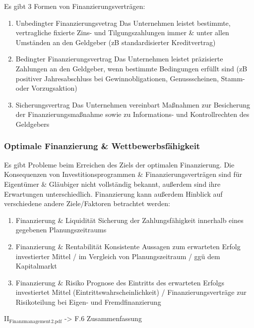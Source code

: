 \documentclass[11pt]{article}
\begin{document}
\begin{enumerate}
Es gibt 3 Formen von Finanzierungsverträgen:

\begin{enumerate}
\item Unbedingter Finanzierungsvetrag
Das Unternehmen leistet bestimmte, vertragliche fixierte Zins- und Tilgungszahlungen immer \& unter allen Umständen an den Geldgeber (zB standardisierter Kreditvertrag)

\item Bedingter Finanzierungsvertrag
Das Unternehmen leistet präzisierte Zahlungen an den Geldgeber, wenn bestimmte Bedingungen erfüllt sind (zB positiver Jahresabschluss bei Gewinnobligationen, Genussscheinen, Stamm- oder Vorzugsaktion)

\item Sicherungsvertrag
Das Unternehmen vereinbart Maßnahmen zur Besicherung der Finanzierungsmaßnahme sowie zu Informations- und Kontrollrechten des Geldgebers
\end{enumerate}
\end{enumerate}

\subsubsection{Optimale Finanzierung \& Wettbewerbsfähigkeit}
\label{sec:org65ee8f7}
Es gibt Probleme beim Erreichen des Ziels der optimalen Finanzierung. Die Konsequenzen von Investitionsprogrammen \& Finanzierungsverträgen sind für Eigentümer \& Gläubiger nicht vollständig bekannt, außerdem sind ihre Erwartungen unterschiedlich. Finanzierung kann außerdem Hinblick auf verschiedene andere Ziele/Faktoren betrachtet werden:

\begin{enumerate}
\item Finanzierung \& Liquidität
Sicherung der Zahlungsfähigkeit innerhalb eines gegebenen Planungszeitraums

\item Finanzierung \& Rentabilität
Konsistente Aussagen zum erwarteten Erfolg investierter Mittel / im Vergleich von Planungszeitraum / ggü dem Kapitalmarkt

\item Finanzierung \& Risiko
Prognose des Eintritts des erwarteten Erfolgs investiertet Mittel (Eintrittswahrscheinlichkeit) / Finanzierungsverträge zur Risikoteilung bei Eigen- und Fremdfinanzierung
\end{enumerate}

II\(_{\text{Finanzmanagement}}\)\(_{\text{2.pdf}}\) -> F.6 Zusammenfassung
\end{document}
